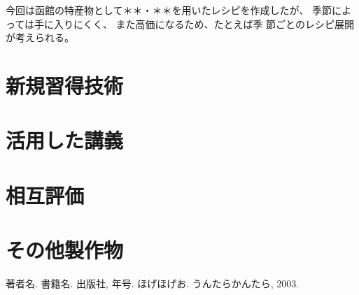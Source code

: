 \documentclass[openany,11pt,papersize]{jsbook}
\begin{document}
今回は函館の特産物として＊＊・＊＊を用いたレシピを作成したが、
季節によっては手に入りにくく、 また高価になるため、たとえば季
節ごとのレシピ展開が考えられる。 


\begin{appendix}

\chapter{新規習得技術}


\chapter{活用した講義}

\chapter{相互評価}

\chapter{その他製作物}

\end{appendix}



\begin{thebibliography}{9}
  著者名. 書籍名. 出版社,  年号.
  ほげほげお. うんたらかんたら,  2003.
\end{thebibliography}
\end{document}
